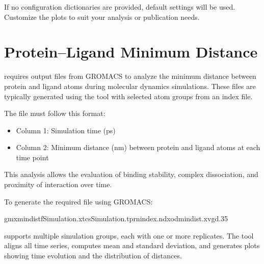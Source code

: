 \documentclass[a4paper,10pt,english]{sphinxmanual}
\begin{document}
\begin{sphinxVerbatim}[commandchars=\\\{\}]
 
\end{sphinxVerbatim}

\sphinxAtStartPar
If no configuration dictionaries are provided, default settings will be used. Customize the plots to suit your analysis or publication needs.


\section{Protein–Ligand Minimum Distance}
\label{\detokenize{Input:proteinligand-minimum-distance}}
\sphinxAtStartPar
{} requires  output files from GROMACS to analyze the minimum distance between protein and ligand atoms during molecular dynamics simulations. These files are typically generated using the  tool with selected atom groups from an index file.

\sphinxAtStartPar
The  file must follow this format:
\begin{itemize}
\item {} 
\sphinxAtStartPar
Column 1: Simulation time (ps)

\item {} 
\sphinxAtStartPar
Column 2: Minimum distance (nm) between protein and ligand atoms at each time point

\end{itemize}

\sphinxAtStartPar
This analysis allows the evaluation of binding stability, complex dissociation, and proximity of interaction over time.

\sphinxAtStartPar
To generate the required  file using GROMACS:

\begin{sphinxVerbatim}[commandchars=\\\{\}]
gmxmindist\PYGZhy{}fSimulation.xtc\PYGZhy{}sSimulation.tpr\PYGZhy{}nindex.ndx\PYGZhy{}odmindist.xvg\PYGZhy{}d.35
\end{sphinxVerbatim}

\sphinxAtStartPar
{} supports multiple simulation groups, each with one or more replicates. The tool aligns all time series, computes mean and standard deviation, and generates plots showing time evolution and the distribution of distances.
\end{document}
